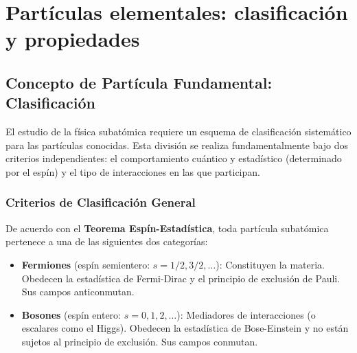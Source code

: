 
\chapter{Partículas elementales: clasificación y propiedades}
\label{chap:tema1}


\section{Concepto de Partícula Fundamental: Clasificación}

El estudio de la física subatómica requiere un esquema de clasificación sistemático para las partículas conocidas. Esta división se realiza fundamentalmente bajo dos criterios independientes: el comportamiento cuántico y estadístico (determinado por el espín) y el tipo de interacciones en las que participan.

\subsection{Criterios de Clasificación General}

\begin{concepto}
De acuerdo con el \textbf{Teorema Espín-Estadística}, toda partícula subatómica pertenece a una de las siguientes dos categorías:
\begin{itemize}
    \item \textbf{Fermiones} (espín semientero: $s = 1/2, 3/2, \dots$): Constituyen la materia. Obedecen la estadística de Fermi-Dirac y el principio de exclusión de Pauli. Sus campos anticonmutan.
    \item \textbf{Bosones} (espín entero: $s = 0, 1, 2, \dots$): Mediadores de interacciones (o escalares como el Higgs). Obedecen la estadística de Bose-Einstein y no están sujetos al principio de exclusión. Sus campos conmutan.
\end{itemize}
\end{concepto}

